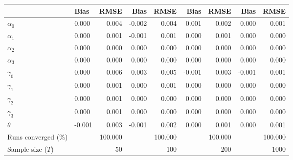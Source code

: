 
\begin{tabular}[t]{llrrrrrrr}
\toprule
  & Bias & RMSE & Bias & RMSE & Bias & RMSE & Bias & RMSE\\
\midrule
$\alpha_{0}$ & 0.000 & 0.004 & -0.002 & 0.004 & 0.001 & 0.002 & 0.000 & 0.001\\
$\alpha_{1}$ & 0.000 & 0.001 & -0.001 & 0.001 & 0.000 & 0.001 & 0.000 & 0.000\\
$\alpha_{2}$ & 0.000 & 0.000 & 0.000 & 0.000 & 0.000 & 0.000 & 0.000 & 0.000\\
$\alpha_{3}$ & 0.000 & 0.000 & 0.000 & 0.000 & 0.000 & 0.000 & 0.000 & 0.000\\
$\gamma_{0}$ & 0.000 & 0.006 & 0.003 & 0.005 & -0.001 & 0.003 & -0.001 & 0.001\\
$\gamma_{1}$ & 0.000 & 0.001 & 0.000 & 0.001 & 0.000 & 0.000 & 0.000 & 0.000\\
$\gamma_{2}$ & 0.000 & 0.001 & 0.000 & 0.000 & 0.000 & 0.000 & 0.000 & 0.000\\
$\gamma_{3}$ & 0.000 & 0.001 & 0.000 & 0.000 & 0.000 & 0.000 & 0.000 & 0.000\\
$\theta$ & -0.001 & 0.003 & -0.001 & 0.002 & 0.000 & 0.001 & 0.000 & 0.001\\
Runs converged (\%) &  & 100.000 &  & 100.000 &  & 100.000 &  & 100.000\\
Sample size ($T$) &  & 50 &  & 100 &  & 200 &  & 1000\\
\bottomrule
\end{tabular}
